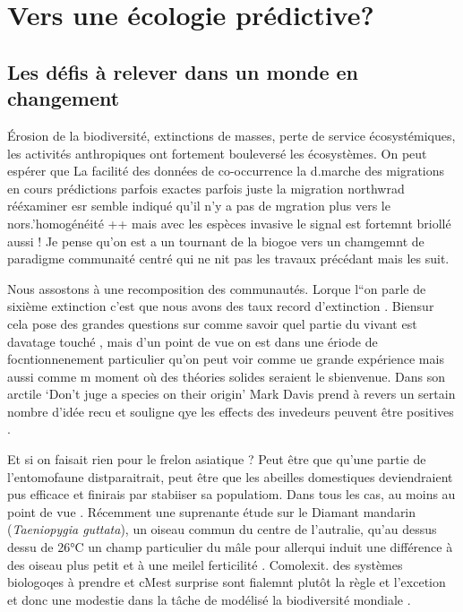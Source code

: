 \section*{Vers une écologie
prédictive?}\label{vers-une-uxe9cologie-pruxe9dictive}

\subsection*{Les défis à relever dans un monde en
changement}\label{les-duxe9fis-uxe0-relever-dans-un-monde-en-changement}

Érosion de la biodiversité, extinctions de masses, perte de service
écosystémiques, les activités anthropiques ont fortement bouleversé les
écosystèmes. On peut espérer que La facilité des données de
co-occurrence la d.marche des migrations en cours prédictions parfois
exactes parfois juste la migration northwrad rééxaminer esr semble
indiqué qu'il n'y a pas de mgration plus vers le nors.'homogénéité ++
mais avec les espèces invasive le signal est fortemnt briollé aussi ! Je
pense qu'on est a un tournant de la biogoe vers un chamgemnt de
paradigme communaité centré qui ne nit pas les travaux précédant mais
les suit.

Nous assostons à une recomposition des communautés. Lorque l``on parle
de sixième extinction c'est que nous avons des taux record d'extinction
\citep{Thomas2004}. Biensur cela pose des grandes questions sur comme
savoir quel partie du vivant est davatage touché \citep{Thuiller2011},
mais d'un point de vue on est dans une ériode de focntionnenement
particulier qu'on peut voir comme ue grande expérience mais aussi comme
m moment où des théories solides seraient le sbienvenue. Dans son
arctile `Don't juge a species on their origin' Mark Davis prend à revers
un sertain nombre d'idée recu et souligne qye les effects des invedeurs
peuvent être positives \citet{Davis2011}.

Et si on faisait rien pour le frelon asiatique ? Peut être que qu'une
partie de l'entomofaune distparaitrait, peut être que les abeilles
domestiques deviendraient pus efficace et finirais par stabiiser sa
populatiom. Dans tous les cas, au moins au point de vue
\citep{Villemant2011}. Récemment une suprenante étude sur le Diamant
mandarin (\emph{Taeniopygia guttata}), un oiseau commun du centre de
l'autralie, qu'au dessus dessu de 26°C un champ particulier du mâle pour
allerqui induit une différence à des oiseau plus petit et à une meilel
ferticilité \citep{Mariette2016}. Comolexit. des systèmes biologoqes à
prendre et cMest surprise sont fialemnt plutôt la règle et l'excetion et
donc une modestie dans la tâche de modélisé la biodiversité mondiale
\citep{Mouquet2015}.

